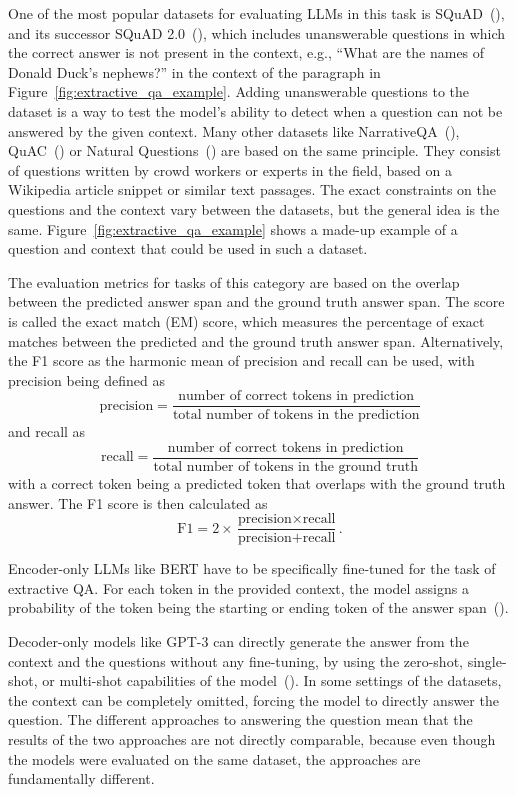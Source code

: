 One of the most popular datasets for evaluating LLMs in this task is SQuAD~(\cite{rajpurkar:2016:SQuAD}), and its successor SQuAD 2.0~(\cite{rajpurkar:2018:Know}), which includes unanswerable questions in which the correct answer is not present in the context, e.g., ``What are the names of Donald Duck's nephews?'' in the context of the paragraph in Figure~\ref{fig:extractive_qa_example}.
Adding unanswerable questions to the dataset is a way to test the model's ability to detect when a question can not be answered by the given context.
Many other datasets like NarrativeQA~(\cite{kovcisky:2018:The}), QuAC~(\cite{choi:2018:QuAC}) or Natural Questions~(\cite{kwiatkowski:2019:Natural}) are based on the same principle.
They consist of questions written by crowd workers or experts in the field, based on a Wikipedia article snippet or similar text passages.
The exact constraints on the questions and the context vary between the datasets, but the general idea is the same.
Figure~\ref{fig:extractive_qa_example} shows a made-up example of a question and context that could be used in such a dataset.

The evaluation metrics for tasks of this category are based on the overlap between the predicted answer span and the ground truth answer span.
The score is called the exact match (EM) score, which measures the percentage of exact matches between the predicted and the ground truth answer span.
Alternatively, the F1 score as the harmonic mean of precision and recall can be used, with precision being defined as
\[ \text{precision} = \frac{\text{number of correct tokens in prediction}}{\text{total number of tokens in the prediction}} \]
and recall as
\[ \text{recall} = \frac{\text{number of correct tokens in prediction}}{\text{total number of tokens in the ground truth}} \]
with a correct token being a predicted token that overlaps with the ground truth answer.
The F1 score is then calculated as
\[ \text{F1} = 2 \times \frac{\text{precision} \times \text{recall}}{\text{precision} + \text{recall}} .\]

Encoder-only LLMs like BERT have to be specifically fine-tuned for the task of extractive QA.
For each token in the provided context, the model assigns a probability of the token being the starting or ending token of the answer span~(\cite{devlin:2018:BERT}).

Decoder-only models like GPT-3 can directly generate the answer from the context and the questions without any fine-tuning, by using the zero-shot, single-shot, or multi-shot capabilities of the model~(\cite{brown:2020:Language}).
In some settings of the datasets, the context can be completely omitted, forcing the model to directly answer the question.
The different approaches to answering the question mean that the results of the two approaches are not directly comparable, because even though the models were evaluated on the same dataset, the approaches are fundamentally different.

